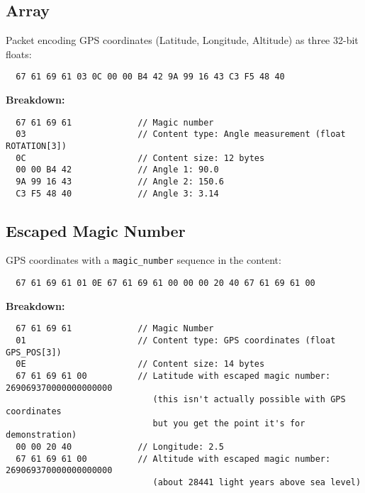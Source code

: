 \documentclass[a4paper]{article}
\begin{document}
\subsection{Array}
\newpage
Packet encoding GPS coordinates (Latitude, Longitude, Altitude) as three 32-bit floats:
\begin{verbatim}
  67 61 69 61 03 0C 00 00 B4 42 9A 99 16 43 C3 F5 48 40
\end{verbatim}
\textbf{Breakdown:}
\begin{verbatim}
  67 61 69 61             // Magic number
  03                      // Content type: Angle measurement (float ROTATION[3])
  0C                      // Content size: 12 bytes
  00 00 B4 42             // Angle 1: 90.0
  9A 99 16 43             // Angle 2: 150.6
  C3 F5 48 40             // Angle 3: 3.14
\end{verbatim}

\subsection{Escaped Magic Number}
GPS coordinates with a \texttt{magic\_number} sequence in the content:
\begin{verbatim}
  67 61 69 61 01 0E 67 61 69 61 00 00 00 20 40 67 61 69 61 00
\end{verbatim}
\textbf{Breakdown:}
\begin{verbatim}
  67 61 69 61             // Magic Number
  01                      // Content type: GPS coordinates (float GPS_POS[3])
  0E                      // Content size: 14 bytes
  67 61 69 61 00          // Latitude with escaped magic number: 269069370000000000000 
                             (this isn't actually possible with GPS coordinates
                             but you get the point it's for demonstration)
  00 00 20 40             // Longitude: 2.5
  67 61 69 61 00          // Altitude with escaped magic number: 269069370000000000000
                             (about 28441 light years above sea level)
\end{verbatim}
\end{document}
